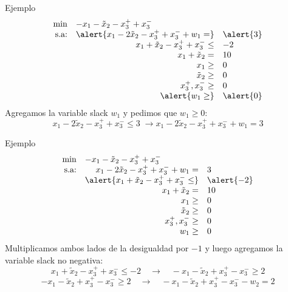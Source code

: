 \documentclass[10pt, aspectratio=169]{beamer}
\begin{document}
    \begin{frame}{Ejemplo}
        \[\begin{array}{rrl}
              \min & \multicolumn{2}{l}{-x_1 - \tilde{x}_2 - x_3^++x_3^-} \\
              \text{s.a:} & \alert{x_1 - 2\tilde{x}_2 - x_3^++x_3^-+w_1 =} & \alert{3} \\
              & x_1 + \tilde{x}_2 - x_3^++x_3^- \leq           & -2        \\
              & x_1 + \tilde{x}_2 =                            & 10        \\
              & x_1\geq                                        & 0         \\
              & \tilde{x}_2 \geq                               & 0         \\
              & x_3^+ ,x_3^- \geq                              & 0         \\
              & \alert{w_1\geq}                                & \alert{0}
        \end{array}
        \]
        Agregamos la variable slack $w_1$ y pedimos que $w_1\geq 0$:
        \[ x_1 - 2\tilde{x}_2 - x_3^++x_3^- \leq 3 \; \rightarrow x_1 - 2\tilde{x}_2 - x_3^++x_3^- + w_1 = 3 \]
    \end{frame}


    \begin{frame}{Ejemplo}
        \[\begin{array}{rrl}
              \min & \multicolumn{2}{l}{-x_1 - \tilde{x}_2 - x_3^++x_3^-} \\
              \text{s.a:} & x_1 - 2\tilde{x}_2 - x_3^++x_3^-+w_1 =       & 3          \\
              & \alert{x_1 + \tilde{x}_2 - x_3^++x_3^- \leq} & \alert{-2} \\
              & x_1 + \tilde{x}_2 =                          & 10         \\
              & x_1\geq                                      & 0          \\
              & \tilde{x}_2 \geq                             & 0          \\
              & x_3^+ ,x_3^- \geq                            & 0          \\
              & w_1\geq                                      & 0
        \end{array}
        \]
        Multiplicamos ambos lados de la desigualdad por $-1$ y luego agregamos la variable slack no negativa:
        \[ x_1 + \tilde{x}_2 - x_3^++x_3^- \leq -2 \quad \rightarrow \quad -x_1 - \tilde{x}_2 + x_3^+-x_3^- \geq 2\]
        \[ -x_1 - \tilde{x}_2 + x_3^+-x_3^- \geq 2 \quad \rightarrow \quad -x_1 - \tilde{x}_2 + x_3^+-x_3^- - w_2 = 2 \]
    \end{frame}
\end{document}
